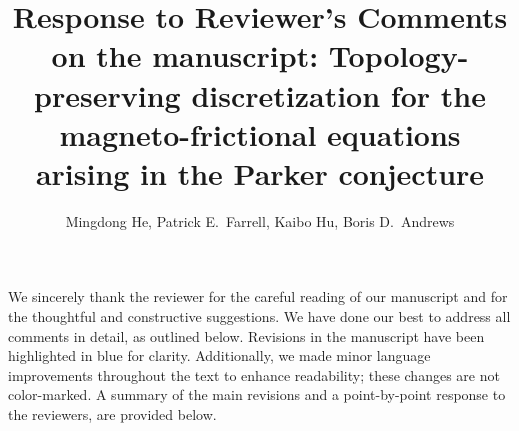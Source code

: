\documentclass{article}
\theoremstyle{definition}
\begin{document}

\title{Response to Reviewer's Comments on the manuscript: Topology-preserving discretization for
the magneto-frictional equations
arising in the Parker conjecture} %
\author{Mingdong He, Patrick E.~Farrell, Kaibo Hu, Boris D.~Andrews} 

\maketitle
We sincerely thank the reviewer for the careful reading of our manuscript and for the thoughtful and constructive suggestions. We have done our best to address all comments in detail, as outlined below. Revisions in the manuscript have been highlighted in blue for clarity. Additionally, we made minor language improvements throughout the text to enhance readability; these changes are not color-marked. A summary of the main revisions and a point-by-point response to the reviewers, are provided below.

\setlength{\parindent}{0pt}
\setlength{\parskip}{1em}
%
\end{document}

